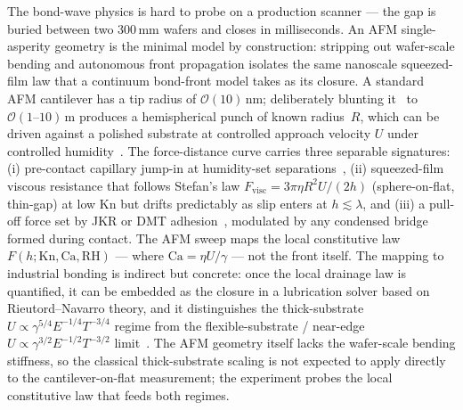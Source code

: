 \documentclass[11pt]{article}
\begin{document}
The bond-wave physics is hard to probe on a production scanner --- the gap is buried between two 300\,mm wafers and closes in milliseconds. An AFM single-asperity geometry is the minimal model by construction: stripping out wafer-scale bending and autonomous front propagation isolates the same nanoscale squeezed-film law that a continuum bond-front model takes as its closure. A standard AFM cantilever has a tip radius of $\mathcal{O}(10)$\,nm; deliberately blunting it~\citep{butt2005force} to $\mathcal{O}(1\text{--}10)$\,\micro m produces a hemispherical punch of known radius~$R$, which can be driven against a polished substrate at controlled approach velocity $U$ under controlled humidity~\citep{butt2018surface}. The force-distance curve carries three separable signatures: (i) pre-contact capillary jump-in at humidity-set separations~\citep{israelachvili2011intermolecular}, (ii) squeezed-film viscous resistance that follows Stefan's law $F_{\mathrm{visc}} = 3\pi \eta R^2 U / (2h)$ (sphere-on-flat, thin-gap) at low $\mathrm{Kn}$ but drifts predictably as slip enters at $h \lesssim \lambda$, and (iii) a pull-off force set by JKR or DMT adhesion~\citep{maugis1992adhesion}, modulated by any condensed bridge formed during contact. The AFM sweep maps the local constitutive law $F(h; \mathrm{Kn}, \mathrm{Ca}, \mathrm{RH})$ --- where $\mathrm{Ca} = \eta U / \gamma$ --- not the front itself. The mapping to industrial bonding is indirect but concrete: once the local drainage law is quantified, it can be embedded as the closure in a lubrication solver based on Rieutord--Navarro theory, and it distinguishes the thick-substrate $U \propto \gamma^{5/4} E^{-1/4} T^{-3/4}$ regime from the flexible-substrate / near-edge $U \propto \gamma^{3/2} E^{-1/2} T^{-3/2}$ limit~\citep{jain2026bond}. The AFM geometry itself lacks the wafer-scale bending stiffness, so the classical thick-substrate scaling is not expected to apply directly to the cantilever-on-flat measurement; the experiment probes the local constitutive law that feeds both regimes.
\end{document}
